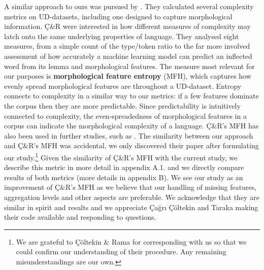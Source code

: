\documentclass[USenglish]{article}
\begin{document}
A similar approach to ours was pursued by \citet{ccoltekin2023complexity}.
They calculated several complexity metrics on UD-datasets, including one designed to capture morphological information.
Ç\&R were interested in how different measures of complexity may latch onto the same underlying properties of language. 
They analysed eight measures, from a simple count of the type/token ratio to the far more involved assessment of how accurately a machine learning model can predict an inflected word from its lemma and morphological features.
The measure most relevant for our purposes is \textbf{morphological feature entropy} (MFH), which captures how evenly spread morphological features are throughout a UD-dataset.
Entropy connects to complexity in a similar way to our metrics: if a few features dominate the corpus then they are more predictable.
Since predictability is intuitively connected to complexity, the even-spreadedness of morphological features in a corpus can indicate the morphological complexity of a language.
Ç\&R's MFH has also been used in further studies, such as \citet{bentz_complexity_2023}.
The similarity between our approach and Ç\&R's MFH was accidental, we only discovered their paper after formulating our study.\footnote{We are grateful to Çöltekin \& Rama for corresponding with us so that we could confirm our understanding of their procedure. Any remaining misunderstandings are our own.}
Given the similarity of Ç\&R's MFH with the current study, we describe this metric in more detail in appendix A.1.
and we directly compare results of both metrics (more details in appendix B). %
We see our study as an improvement of Ç\&R's MFH as we believe that our handling of missing features, aggregation levels and other aspects are preferable. 
We acknowledge that they are similar in spirit and results and we appreciate {\c{C}}a{\u{g}}r{\i} {\c{C}}{\"o}ltekin and Taraka making their code available and responding to questions. 
\end{document}
